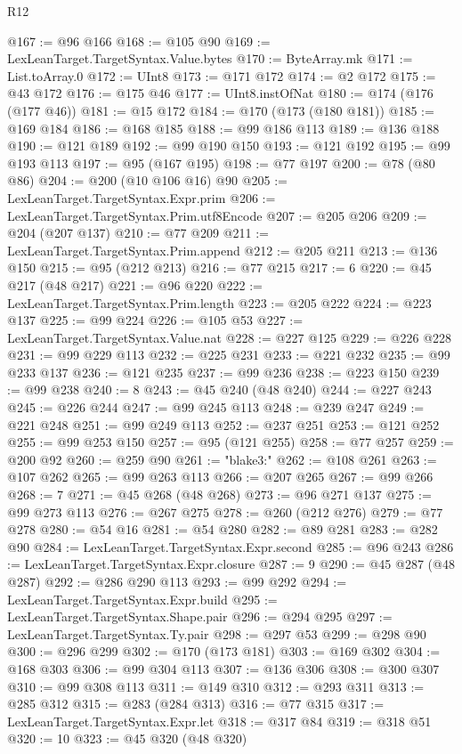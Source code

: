 \begin{lexlean}{R12}
\begin{coremodule}
@167 := @96 @166
@168 := @105 @90
@169 := LexLeanTarget.TargetSyntax.Value.bytes
@170 := ByteArray.mk
@171 := List.toArray.{0}
@172 := UInt8
@173 := @171 @172
@174 := @2 @172
@175 := @43 @172
@176 := @175 @46
@177 := UInt8.instOfNat
@180 := @174 (@176 (@177 @46))
@181 := @15 @172
@184 := @170 (@173 (@180 @181))
@185 := @169 @184
@186 := @168 @185
@188 := @99 @186 @113
@189 := @136 @188
@190 := @121 @189
@192 := @99 @190 @150
@193 := @121 @192
@195 := @99 @193 @113
@197 := @95 (@167 @195)
@198 := @77 @197
@200 := @78 (@80 @86)
@204 := @200 (@10 @106 @16) @90
@205 := LexLeanTarget.TargetSyntax.Expr.prim
@206 := LexLeanTarget.TargetSyntax.Prim.utf8Encode
@207 := @205 @206
@209 := @204 (@207 @137)
@210 := @77 @209
@211 := LexLeanTarget.TargetSyntax.Prim.append
@212 := @205 @211
@213 := @136 @150
@215 := @95 (@212 @213)
@216 := @77 @215
@217 := 6
@220 := @45 @217 (@48 @217)
@221 := @96 @220
@222 := LexLeanTarget.TargetSyntax.Prim.length
@223 := @205 @222
@224 := @223 @137
@225 := @99 @224
@226 := @105 @53
@227 := LexLeanTarget.TargetSyntax.Value.nat
@228 := @227 @125
@229 := @226 @228
@231 := @99 @229 @113
@232 := @225 @231
@233 := @221 @232
@235 := @99 @233 @137
@236 := @121 @235
@237 := @99 @236
@238 := @223 @150
@239 := @99 @238
@240 := 8
@243 := @45 @240 (@48 @240)
@244 := @227 @243
@245 := @226 @244
@247 := @99 @245 @113
@248 := @239 @247
@249 := @221 @248
@251 := @99 @249 @113
@252 := @237 @251
@253 := @121 @252
@255 := @99 @253 @150
@257 := @95 (@121 @255)
@258 := @77 @257
@259 := @200 @92
@260 := @259 @90
@261 := "blake3:"
@262 := @108 @261
@263 := @107 @262
@265 := @99 @263 @113
@266 := @207 @265
@267 := @99 @266
@268 := 7
@271 := @45 @268 (@48 @268)
@273 := @96 @271 @137
@275 := @99 @273 @113
@276 := @267 @275
@278 := @260 (@212 @276)
@279 := @77 @278
@280 := @54 @16
@281 := @54 @280
@282 := @89 @281
@283 := @282 @90
@284 := LexLeanTarget.TargetSyntax.Expr.second
@285 := @96 @243
@286 := LexLeanTarget.TargetSyntax.Expr.closure
@287 := 9
@290 := @45 @287 (@48 @287)
@292 := @286 @290 @113
@293 := @99 @292
@294 := LexLeanTarget.TargetSyntax.Expr.build
@295 := LexLeanTarget.TargetSyntax.Shape.pair
@296 := @294 @295
@297 := LexLeanTarget.TargetSyntax.Ty.pair
@298 := @297 @53
@299 := @298 @90
@300 := @296 @299
@302 := @170 (@173 @181)
@303 := @169 @302
@304 := @168 @303
@306 := @99 @304 @113
@307 := @136 @306
@308 := @300 @307
@310 := @99 @308 @113
@311 := @149 @310
@312 := @293 @311
@313 := @285 @312
@315 := @283 (@284 @313)
@316 := @77 @315
@317 := LexLeanTarget.TargetSyntax.Expr.let
@318 := @317 @84
@319 := @318 @51
@320 := 10
@323 := @45 @320 (@48 @320)

\end{coremodule}
\end{lexlean}
